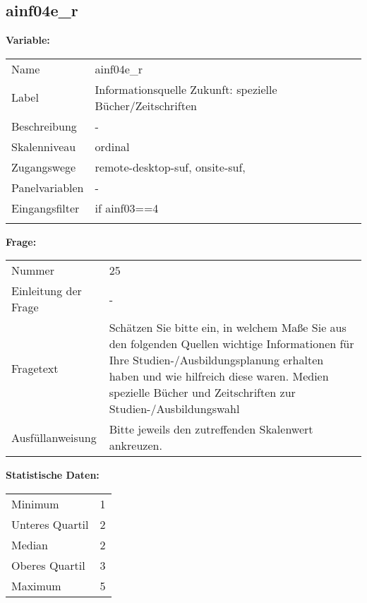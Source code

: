 	
	
	\subsection{ainf04e\_r}
	\label{subSection:ainf04e_r}

	\noindent\textbf{Variable:}\\
		\begin{tabular}{lL{11.3cm}}
			\label{tableVariable:ainf04e_r}
			Name & ainf04e\_r \\
			Label & Informationsquelle Zukunft: spezielle Bücher/Zeitschriften \\
			Beschreibung & - \\
			Skalenniveau & ordinal \\
			Zugangswege &
				remote-desktop-suf,
				onsite-suf,
 \\
			Panelvariablen & -
			 \\
			Eingangsfilter & if ainf03==4 \\
 \\
		\end{tabular}

		\vspace*{1 cm}
		\noindent\textbf{Frage:}\\
		\begin{tabular}{lL{11.3cm}}
			\label{tableQuestion:ainf04e_r}
			Nummer & 25 \\
			Einleitung der Frage & - \\
			Fragetext & Schätzen Sie bitte ein, in welchem Maße Sie aus den folgenden Quellen wichtige Informationen für Ihre Studien-/Ausbildungsplanung erhalten haben und wie hilfreich diese waren.
Medien
spezielle Bücher und Zeitschriften zur Studien-/Ausbildungswahl \\
			Ausfüllanweisung & Bitte jeweils den zutreffenden Skalenwert ankreuzen. \\
		\end{tabular}


		\vspace*{1 cm}
		\noindent\textbf{Statistische Daten:}\\
			\begin{tabular}{ll}
				\label{tableStatistics:ainf04e_r}
					Minimum & 1 \\
					Unteres Quartil & 2 \\
					Median & 2 \\
					Oberes Quartil & 3 \\
					Maximum & 5 \\
			\end{tabular}



